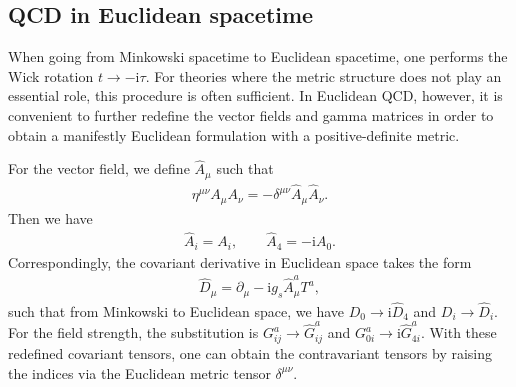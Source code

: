\documentclass[review]{elsarticle}
\numberwithin{equation}{section}
\numberwithin{table}{section}
\numberwithin{figure}{section}
\def\i{\mathrm{i}}
\begin{document}
\subsection{QCD in Euclidean spacetime}

When going from Minkowski spacetime to Euclidean spacetime, one performs the Wick rotation $t\rightarrow-\i\tau$. For theories where the metric structure does not play an essential role, this procedure is often sufficient. In Euclidean QCD, however, it is convenient to further redefine the vector fields and gamma matrices in order to obtain a manifestly Euclidean formulation with a positive-definite metric.


For the vector field, we define $\hat{A}_{\mu}$ such that
\begin{align}
    \eta^{\mu\nu}A_{\mu}A_\nu=-\delta^{\mu\nu}\hat{A}_{\mu}\hat{A}_{\nu}.
\end{align}
Then we have~\cite{Vainshtein:1981wh} 
\begin{align}
    \hat{A}_i = A_i,
    \qquad 
    \hat{A}_4 = -\i A_0.
\end{align}
Correspondingly, the covariant derivative in Euclidean space takes the form
\begin{align}
    \hat{D}_\mu=\partial_\mu-\i g_s \hat{A}_\mu^a T^a,
\end{align}
such that from Minkowski to Euclidean space, we have $D_0\rightarrow \i\hat{D}_4$ and $D_i\rightarrow \hat{D}_i$. For the field strength, the substitution is $G^a_{ij}\rightarrow \hat{G}^a_{ij}$ and $G^a_{0i}\rightarrow \i\hat{G}^a_{4i}$. With these redefined covariant tensors, one can obtain the contravariant tensors by raising the indices via the Euclidean metric tensor $\delta^{\mu\nu}$.
\end{document}
